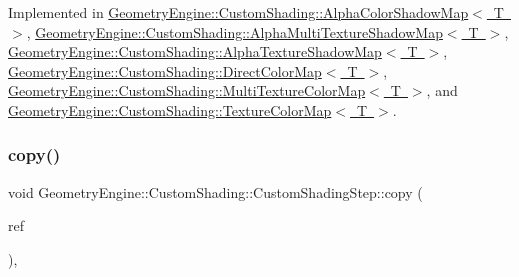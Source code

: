 Implemented in \mbox{\hyperlink{class_geometry_engine_1_1_custom_shading_1_1_alpha_color_shadow_map_a9c9a47e7868b8ef033626de0994a1733}{Geometry\+Engine\+::\+Custom\+Shading\+::\+Alpha\+Color\+Shadow\+Map$<$ T $>$}}, \mbox{\hyperlink{class_geometry_engine_1_1_custom_shading_1_1_alpha_multi_texture_shadow_map_a7a62881619d6247fee10fb74d4fc79e2}{Geometry\+Engine\+::\+Custom\+Shading\+::\+Alpha\+Multi\+Texture\+Shadow\+Map$<$ T $>$}}, \mbox{\hyperlink{class_geometry_engine_1_1_custom_shading_1_1_alpha_texture_shadow_map_a5ff646b3f8b6da56acd2d98f09265769}{Geometry\+Engine\+::\+Custom\+Shading\+::\+Alpha\+Texture\+Shadow\+Map$<$ T $>$}}, \mbox{\hyperlink{class_geometry_engine_1_1_custom_shading_1_1_direct_color_map_aef31a0e4c639e006292dde48e9d2c710}{Geometry\+Engine\+::\+Custom\+Shading\+::\+Direct\+Color\+Map$<$ T $>$}}, \mbox{\hyperlink{class_geometry_engine_1_1_custom_shading_1_1_multi_texture_color_map_a74c244479b1a529cf311fea441c44159}{Geometry\+Engine\+::\+Custom\+Shading\+::\+Multi\+Texture\+Color\+Map$<$ T $>$}}, and \mbox{\hyperlink{class_geometry_engine_1_1_custom_shading_1_1_texture_color_map_a6ad5122de9e2e82000a69b9a777845b1}{Geometry\+Engine\+::\+Custom\+Shading\+::\+Texture\+Color\+Map$<$ T $>$}}.

\mbox{\label{class_geometry_engine_1_1_custom_shading_1_1_custom_shading_step_aa19da7a0827568a1f4741ba4f944cbdd}} 
\subsubsection{\texorpdfstring{copy()}{copy()}}
{\footnotesize\ttfamily void Geometry\+Engine\+::\+Custom\+Shading\+::\+Custom\+Shading\+Step\+::copy (\begin{DoxyParamCaption}\item[{const \mbox{\hyperlink{class_geometry_engine_1_1_custom_shading_1_1_custom_shading_step}{Custom\+Shading\+Step}} \&}]{ref }\end{DoxyParamCaption})\hspace{0.3cm}{\ttfamily [protected]}, {\ttfamily [virtual]}}

